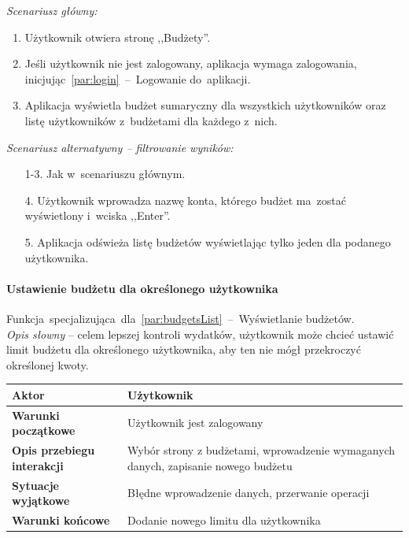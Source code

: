 \noindent \textit{Scenariusz główny:}
\begin{enumerate}
  \item Użytkownik otwiera stronę ,,Budżety''.
  \item Jeśli użytkownik nie jest zalogowany, aplikacja wymaga zalogowania, inicjując~\ref{par:login}~--~Logowanie do~aplikacji.
  \item Aplikacja wyświetla budżet sumaryczny dla wszystkich użytkowników oraz listę użytkowników z~budżetami dla każdego z~nich.
\end{enumerate}

\noindent \textit{Scenariusz alternatywny -- filtrowanie wyników:}
\begin{enumerate}
  \item[1-3.] Jak w~scenariuszu głównym.
  \item[4.] Użytkownik wprowadza nazwę konta, którego budżet ma~zostać wyświetlony i~wciska ,,Enter''.
  \item[5.] Aplikacja odświeża listę budżetów wyświetlając tylko jeden dla podanego użytkownika.
\end{enumerate}

\paragraph{Ustawienie budżetu dla określonego użytkownika\newline}
\label{par:userBudget}
Funkcja~specjalizująca~dla~\ref{par:budgetsList}~--~Wyświetlanie budżetów.\\

\textit{Opis słowny} -- celem lepszej kontroli wydatków, użytkownik może chcieć ustawić limit budżetu dla określonego użytkownika, aby ten nie mógł przekroczyć określonej kwoty.

\begin{longtable}{|p{5cm}|p{7cm}|}
  \hline \textbf{Aktor} & Użytkownik \\
  \hline \textbf{Warunki początkowe} & Użytkownik jest zalogowany \\
  \hline \textbf{Opis przebiegu interakcji} & Wybór strony z budżetami, wprowadzenie wymaganych danych, zapisanie nowego budżetu \\
  \hline \textbf{Sytuacje wyjątkowe} & Błędne wprowadzenie danych, przerwanie operacji \\
  \hline \textbf{Warunki końcowe} & Dodanie nowego limitu dla użytkownika \\
  \hline
\end{longtable}

